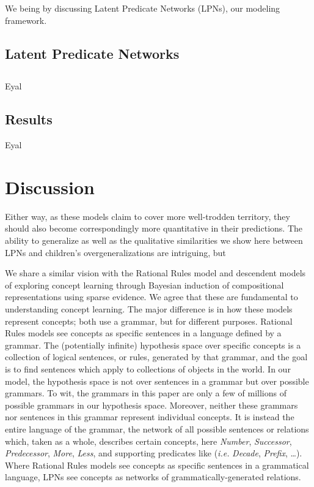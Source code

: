 \documentclass[10pt,letterpaper]{article}
\begin{document}
We being by discussing Latent Predicate Networks
(LPNs), our modeling framework.

\subsection{Latent Predicate Networks}

\subsection{}

Eyal

\subsection{Results}

Eyal

\section{Discussion}


Either way, as these models claim to cover more well-trodden
territory, they should also become correspondingly more quantitative
in their predictions. The ability to generalize as well as the
qualitative similarities we show here between LPNs and children's
overgeneralizations are intriguing, but 


We share a similar vision with the Rational Rules model and descendent
models
\citep{goodman2008rational,T.D.Ullman:2012:1b1b6,PianGoodTen2012} of
exploring concept learning through Bayesian induction of compositional
representations using sparse evidence. We agree that these are
fundamental to understanding concept learning. The major difference is
in how these models represent concepts; both use a grammar, but for
different purposes. Rational Rules models see concepts as specific
sentences in a language defined by a grammar. The (potentially
infinite) hypothesis space over specific concepts is a collection of
logical sentences, or rules, generated by that grammar, and the goal
is to find sentences which apply to collections of objects in the
world. In our model, the hypothesis space is not over sentences in a
grammar but over possible grammars. To wit, the grammars in this paper
are only a few of millions of possible grammars in our hypothesis
space. Moreover, neither these grammars nor sentences in this grammar
represent individual concepts. It is instead the entire language of
the grammar, the network of all possible sentences or relations which,
taken as a whole, describes certain concepts, here \emph{Number},
\emph{Successor}, \emph{Predecessor}, \emph{More}, \emph{Less}, and
supporting predicates like ({\it i.e.} \emph{Decade}, \emph{Prefix},
\ldots). Where Rational Rules models see concepts as specific
sentences in a grammatical language, LPNs see concepts as networks of
grammatically-generated relations.
\end{document}
